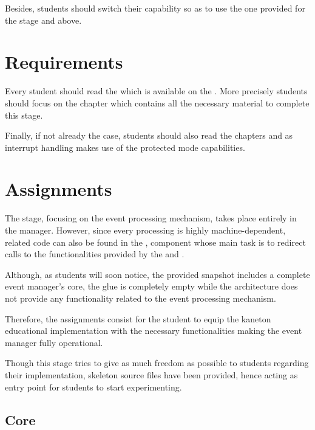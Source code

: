 Besides, students should switch their capability so as to use the one provided
for the stage  and above.

%
%

\section{Requirements}

Every student should read the  which
is available on the . More precisely students should focus
on the chapter  which contains
all the necessary material to complete this stage.

Finally, if not already the case, students should also read the chapters
 and  as interrupt
handling makes use of the protected mode capabilities.

%
%

\section{Assignments}

The  stage, focusing on the event processing mechanism, takes place
entirely in the  manager. However, since every processing is
highly machine-dependent, related code can also be found in the ,
component whose main task is to redirect calls to the functionalities provided
by the  and .

Although, as students will soon notice, the provided snapshot includes a
complete event manager's core, the glue is completely empty while the
architecture does not provide any functionality related to the event
processing mechanism.

Therefore, the  assignments consist for the student to equip the
kaneton educational implementation with the necessary functionalities making
the event manager fully operational.

Though this stage tries to give as much freedom as possible to students
regarding their implementation, skeleton source files have been provided, hence
acting as entry point for students to start experimenting.

\subsection{Core}


